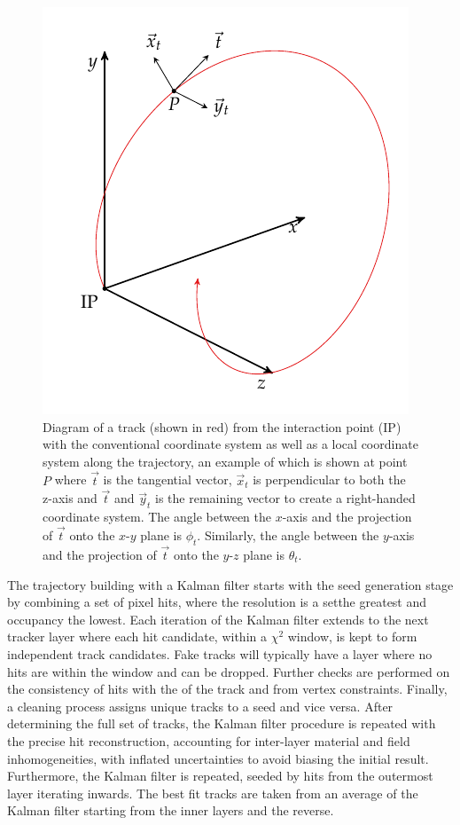 \begin{figure}
    \centering
    \includegraphics{diagrams/tikz/kf_parameters/kf_parameters.pdf}
    \caption{
        Diagram of a track (shown in red) from the interaction point (IP) with
        the conventional \CMS coordinate system as well as a local coordinate
        system along the trajectory, an example of which is shown at point $P$
        where $\vec{t}$ is the tangential vector, $\vec{x}_{t}$ is
        perpendicular to both the z-axis and $\vec{t}$ and $\vec{y}_{t}$ is
        the remaining vector to create a right-handed coordinate system. The
        angle between the $x$-axis and the projection of ${\vec{t}}$ onto the
        $x$-$y$ plane is $\phi_t$. Similarly, the angle between the $y$-axis
        and the projection of ${\vec{t}}$ onto the $y$-$z$ plane is $\theta_t$.
    }
    \label{fig:kf_parameters}
\end{figure}

The trajectory building with a Kalman filter starts with the seed generation
stage by combining a set of pixel hits, where the resolution is  a setthe
greatest and occupancy the lowest. Each iteration of the Kalman filter extends
to the next tracker layer where each hit candidate, within a $\chi^2$ window,
is kept to form independent track candidates. Fake tracks will typically have
a layer where no hits are within the window and can be dropped. Further checks
are performed on the consistency of hits with the \pt of the track and from
vertex constraints. Finally, a cleaning process assigns unique tracks to a
seed and vice versa. After determining the full set of tracks, the Kalman
filter procedure is repeated with the precise hit reconstruction, accounting
for inter-layer material and field inhomogeneities, with inflated
uncertainties to avoid biasing the initial result. Furthermore, the Kalman
filter is repeated, seeded by hits from the outermost layer iterating inwards.
The best fit tracks are taken from an average of the Kalman filter starting
from the inner layers and the reverse.

